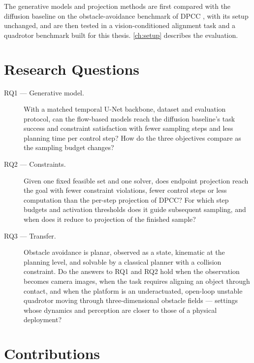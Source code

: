 The generative models and projection methods are first compared with the diffusion baseline on the
obstacle-avoidance benchmark of \ac{DPCC} \parencite{romer2025diffusion,jia2024towards}, with its
setup unchanged, and are then tested in a vision-conditioned alignment task and a quadrotor benchmark
built for this thesis. \autoref{ch:setup} describes the evaluation.

\section{Research Questions}\label{sec:intro:rqs}

\begin{description}
  \item[RQ1 --- Generative model.] With a matched temporal U-Net backbone, dataset and evaluation
    protocol, can the flow-based models reach the diffusion baseline's task success and constraint
    satisfaction with fewer sampling steps and less planning time per control step? How do the three
    objectives compare as the sampling budget changes?
  \item[RQ2 --- Constraints.] Given one fixed feasible set and one solver, does endpoint projection
    reach the goal with fewer constraint violations, fewer control steps or less computation than
    the per-step projection of \ac{DPCC}? For which step budgets and activation thresholds does it
    guide subsequent sampling, and when does it reduce to projection of the finished sample?
  \item[RQ3 --- Transfer.] Obstacle avoidance is planar, observed as a state, kinematic at the
    planning level, and solvable by a classical planner with a collision constraint. Do the answers
    to RQ1 and RQ2 hold when the observation becomes camera images, when the task requires aligning
    an object through contact, and when the platform is an underactuated, open-loop unstable
    quadrotor moving through three-dimensional obstacle fields --- settings whose dynamics and
    perception are closer to those of a physical deployment?
\end{description}


\section{Contributions}\label{sec:intro:contributions}

